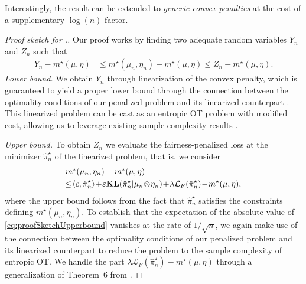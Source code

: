 \documentclass{article}
\theoremstyle{definition}
\begin{document}
Interestingly, the result can be extended to \emph{generic convex penalties} at the cost of a supplementary $\log(n)$ factor.
\begin{proof}[Proof sketch for .]
Our proof works by finding two adequate random variables $Y_n$ and $Z_n$ such that
\begin{align*}
    Y_n\!- \!m^\star(\mu,\eta)&\!\leq\! m^\star(\mu_n,\eta_n)\!-\!m^\star(\mu,\eta)
    \!\leq\! Z_n\!-\!m^\star(\mu,\eta). 
\end{align*}
\textit{Lower bound.} We obtain $Y_n$ through linearization of the convex penalty, which is guaranteed to yield a proper lower bound through the connection between the optimality conditions of our penalized problem and its linearized counterpart \citep{rakotomamonjy2015generalized}. This linearized problem can be cast as an entropic OT problem with modified cost, allowing us to leverage existing sample complexity results \citep{genevay2019entropy,mena2019statistical}. 

\textit{Upper bound.} To obtain $Z_n$ we evaluate the fairness-penalized loss at the minimizer $\hat{\pi}_n^\star$ of the linearized problem, that is, we consider
\begin{align}\label{eq:proofSketchUpperbound}
    m^\star(\mu_n,\eta_n)-m^\star(\mu,\eta)&\nonumber\\&\hspace{-10em}\leq \!\langle c,\hat{\pi}_n^\star\rangle\!+\!\varepsilon\textbf{KL}(\hat \pi_n^\star| \mu_n\!\otimes\! \eta_n)\!+\!\lambda\mathcal{L}_F(\hat\pi_n^\star)\!-\!m^\star(\mu,\eta),
\end{align}
where the upper bound follows from the fact that $\hat{\pi}_n^\star$ satisfies the constraints defining $m^\star(\mu_n,\eta_n)$. To establish that the expectation of the absolute value of \eqref{eq:proofSketchUpperbound} vanishes at the rate of $1/\sqrt{n}$, we again make use of the connection between the optimality conditions of our penalized problem and its linearized counterpart \citep{rakotomamonjy2015generalized} to reduce the problem to the sample complexity of entropic OT. We handle the part $\lambda\mathcal{L}_F(\hat\pi_n^\star)-m^\star(\mu,\eta)$ through a generalization of Theorem~6 from \citep{rigollet2022sample}.
\end{proof}
\end{document}
